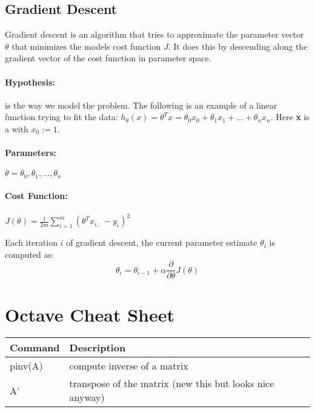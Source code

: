 \documentclass[11pt,a4paper]{article}
\begin{document}
\subsection{Gradient Descent}
Gradient descent is an algorithm that tries to approximate the parameter vector $\theta$ that minimizes the models cost function $J$.
It does this by descending along the gradient vector of the cost function in parameter space.
\paragraph{Hypothesis:} is the way we model the problem. 
The following is an example of a linear function trying to fit the data: $h_\theta(x) = \theta^Tx = \theta_0x_0 + \theta_1x_1 + \ldots + \theta_nx_n$.
Here \textbf{x} is a  with $x_0:=1$.

\paragraph{Parameters:} $\theta = \theta_0, \theta_1, \ldots, \theta_n$
\paragraph{Cost Function:} 	$J(\theta)=\frac{1}{2m}\sum\limits_{i=1}^m(\theta^Tx_{i,:}-y_i)^2$

Each iteration $i$ of gradient descent, the current parameter estimate $\theta_i$ is computed as:
\begin{equation}
\theta_i = \theta_{i-1} + \alpha\frac{\partial}{\partial \theta}J(\theta)
\end{equation}



\section*{Octave Cheat Sheet}
\begin{tabular}{l|l}
\textbf{Command}&\textbf{Description}\\
\hline
pinv(A)&compute inverse of a matrix\\
A'&transpose of the matrix (new this but looks nice anyway)
\end{tabular}
\end{document}
